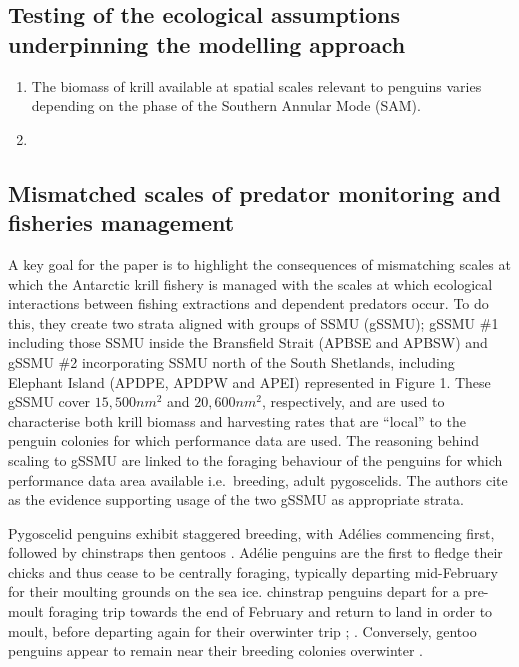 \documentclass[]{elsarticle} %
\providecommand{\tightlist}{%
  \setlength{\itemsep}{0pt}\setlength{\parskip}{0pt}}
\begin{document}
\subsection{Testing of the ecological assumptions underpinning the
modelling
approach}\label{testing-of-the-ecological-assumptions-underpinning-the-modelling-approach}

\begin{enumerate}
\def\labelenumi{\arabic{enumi}.}
\tightlist
\item
  The biomass of krill available at spatial scales relevant to penguins
  varies depending on the phase of the Southern Annular Mode (SAM).
\item
\end{enumerate}

\subsection{Mismatched scales of predator monitoring and fisheries
management}\label{mismatched-scales-of-predator-monitoring-and-fisheries-management}

A key goal for the paper is to highlight the consequences of mismatching
scales at which the Antarctic krill fishery is managed with the scales
at which ecological interactions between fishing extractions and
dependent predators occur. To do this, they create two strata aligned
with groups of SSMU (gSSMU); gSSMU \#1 including those SSMU inside the
Bransfield Strait (APBSE and APBSW) and gSSMU \#2 incorporating SSMU
north of the South Shetlands, including Elephant Island (APDPE, APDPW
and APEI) represented in Figure 1. These gSSMU cover \(15,500nm^2\) and
\(20,600nm^2\), respectively, and are used to characterise both krill
biomass and harvesting rates that are ``local'' to the penguin colonies
for which performance data are used. The reasoning behind scaling to
gSSMU are linked to the foraging behaviour of the penguins for which
performance data area available i.e.~breeding, adult pygoscelids. The
authors cite \citet{Hinke2017} as the evidence supporting usage of the
two gSSMU as appropriate strata.

Pygoscelid penguins exhibit staggered breeding, with Adélies commencing
first, followed by chinstraps then gentoos \citep{Black2016}. Adélie
penguins are the first to fledge their chicks and thus cease to be
centrally foraging, typically departing mid-February for their moulting
grounds on the sea ice. chinstrap penguins depart for a pre-moult
foraging trip towards the end of February and return to land in order to
moult, before departing again for their overwinter trip
\citet{Hinke2015}; \citet{Hinke2019}. Conversely, gentoo penguins appear
to remain near their breeding colonies overwinter
\citep{korczak-abshireCoastalRegionsNorthern2021}.
\end{document}
